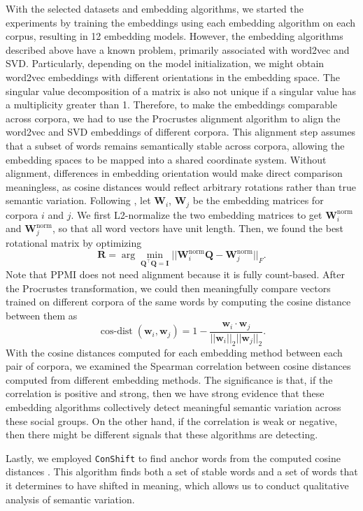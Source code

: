 \documentclass[11pt]{article}
\begin{document}
With the selected datasets and embedding algorithms, we started the experiments by training the embeddings using each embedding algorithm on each corpus, resulting in 12 embedding models. However, the embedding algorithms described above have a known problem, primarily associated with word2vec and SVD. Particularly, depending on the model initialization, we might obtain word2vec embeddings with different orientations in the embedding space. The singular value decomposition of a matrix is also not unique if a singular value has a multiplicity greater than 1. Therefore, to make the embeddings comparable across corpora, we had to use the Procrustes alignment algorithm to align the word2vec and SVD embeddings of different corpora. This alignment step assumes that a subset of words remains semantically stable across corpora, allowing the embedding spaces to be mapped into a shared coordinate system. Without alignment, differences in embedding orientation would make direct comparison meaningless, as cosine distances would reflect arbitrary rotations rather than true semantic variation. Following \citet{hamilton2016diachronic}, let \( \mathbf{W}_i \), \( \mathbf{W}_j \) be the embedding matrices for corpora \( i \) and \( j \). We first L2-normalize the two embedding matrices to get \( \mathbf{W}_i^{\text{norm}} \) and \( \mathbf{W}_j^{\text{norm}} \), so that all word vectors have unit length. Then, we found the best rotational matrix by optimizing
\[ \mathbf{R} = \arg \min_{\mathbf{Q}^\top \mathbf{Q} = \mathbf{I}} ||\mathbf{W}_i^{\text{norm}} \mathbf{Q} - \mathbf{W}_j^{\text{norm}}||_F. \]
Note that PPMI does not need alignment because it is fully count-based. After the Procrustes transformation, we could then meaningfully compare vectors trained on different corpora of the same words by computing the cosine distance between them as
\[ \operatorname{cos-dist}(\mathbf{w}_i, \mathbf{w}_j) = 1 - \frac{\mathbf{w}_i \cdot \mathbf{w}_j}{||\mathbf{w}_i||_2 ||\mathbf{w}_j||_2}. \]
With the cosine distances computed for each embedding method between each pair of corpora, we examined the Spearman correlation between cosine distances computed from different embedding methods. The significance is that, if the correlation is positive and strong, then we have strong evidence that these embedding algorithms collectively detect meaningful semantic variation across these social groups. On the other hand, if the correlation is weak or negative, then there might be different signals that these algorithms are detecting.

Lastly, we employed \texttt{ConShift} to find anchor words from the computed cosine distances \cite{arrington2025conshift}. This algorithm finds both a set of stable words and a set of words that it determines to have shifted in meaning, which allows us to conduct qualitative analysis of semantic variation.
\end{document}

